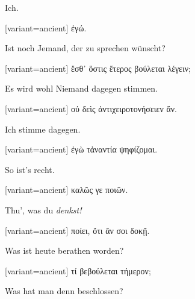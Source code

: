 Ich.

\switchcolumn

\begin{greek}[variant=ancient]%
ἐγώ.

\end{greek}%
\switchcolumn*

Ist noch Jemand, der zu sprechen wünscht?

\switchcolumn

\begin{greek}[variant=ancient]%
ἔσθ᾽ ὅστις ἕτερος βούλεται λέγειν;

\end{greek}%
\switchcolumn*

Es wird wohl Niemand dagegen stimmen.

\switchcolumn

\begin{greek}[variant=ancient]%
οὐ δεὶς ἀντιχειροτονήσειεν ἄν.

\end{greek}%
\switchcolumn*

Ich stimme dagegen.

\switchcolumn

\begin{greek}[variant=ancient]%
ἐγὼ τἀναντία ψηφίζομαι.

\end{greek}%
\switchcolumn*

So ist's recht.

\switchcolumn

\begin{greek}[variant=ancient]%
καλῶς γε ποιῶν.

\end{greek}%
\switchcolumn*

Thu', was du \emph{denkst!} 

\switchcolumn

\begin{greek}[variant=ancient]%
ποίει, ὅτι ἄν σοι δοκῇ.

\end{greek}%
\switchcolumn*

Was ist heute berathen worden?

\switchcolumn

\begin{greek}[variant=ancient]%
τί βεβούλεται τήμερον;

\end{greek}%
\switchcolumn*

Was hat man denn beschlossen?

